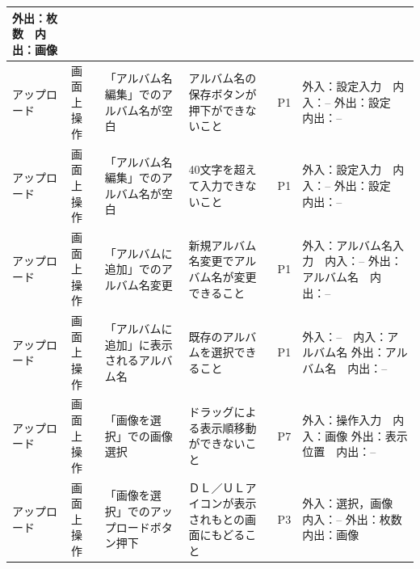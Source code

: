 \begin{table}[htbp]
\begin{tabular}{|p{8em}|p{7em}|p{9em}|p{9em}|p{3em}|p{12em}|}
外出：枚数　内出：画像 \bigstrut\\
    \hline
    アップロード & 画面上操作 & \multicolumn{1}{p{8em}|}{「アルバム名編集」でのアルバム名が空白} & アルバム名の保存ボタンが押下ができないこと & P1    & 外入：設定入力　内入：--
外出：設定　内出：-- \bigstrut\\
    \hline
    アップロード & 画面上操作 & \multicolumn{1}{p{8em}|}{「アルバム名編集」でのアルバム名が空白} & 40文字を超えて入力できないこと & P1    & 外入：設定入力　内入：--
外出：設定　内出：-- \bigstrut\\
    \hline
    アップロード & 画面上操作 & \multicolumn{1}{p{8em}|}{「アルバムに追加」でのアルバム名変更} & 新規アルバム名変更でアルバム名が変更できること & P1    & 外入：アルバム名入力　内入：--
外出：アルバム名　内出：-- \bigstrut\\
    \hline
    アップロード & 画面上操作 & \multicolumn{1}{p{8em}|}{「アルバムに追加」に表示されるアルバム名} & 既存のアルバムを選択できること & P1    & 外入：--　内入：アルバム名
外出：アルバム名　内出：-- \bigstrut\\
    \hline
    アップロード & 画面上操作 & 「画像を選択」での画像選択 & ドラッグによる表示順移動ができないこと & P7    & 外入：操作入力　内入：画像
外出：表示位置　内出：-- \bigstrut\\
    \hline
    アップロード & 画面上操作 & 「画像を選択」でのアップロードボタン押下 & ＤＬ／ＵＬアイコンが表示されもとの画面にもどること & P3    & 外入：選択，画像　内入：--
外出：枚数　内出：画像 \bigstrut\\
    \hline
    \end{tabular}%
  \label{tab:D-4-ER2-2}%
\end{table}%

